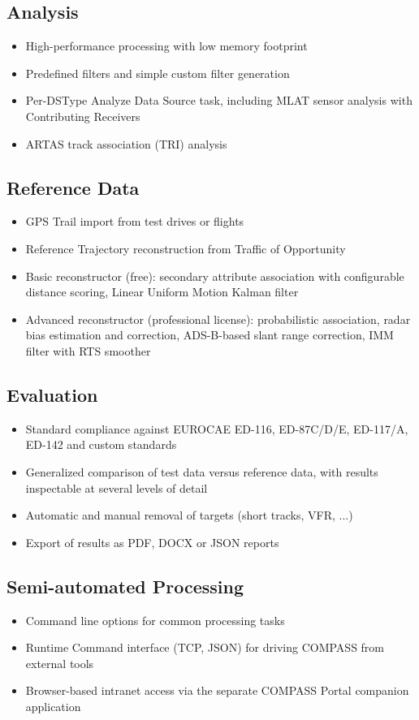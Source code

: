 \subsection{Analysis}
\begin{itemize}
    \item High-performance processing with low memory footprint
    \item Predefined filters and simple custom filter generation
    \item Per-DSType Analyze Data Source task, including MLAT sensor analysis with Contributing Receivers
    \item ARTAS track association (TRI) analysis
\end{itemize}

\subsection{Reference Data}
\begin{itemize}
    \item GPS Trail import from test drives or flights
    \item Reference Trajectory reconstruction from Traffic of Opportunity
    \item Basic reconstructor (free): secondary attribute association with configurable distance scoring, Linear Uniform Motion Kalman filter
    \item Advanced reconstructor (professional license): probabilistic association, radar bias estimation and correction, ADS-B-based slant range correction, IMM filter with RTS smoother
\end{itemize}

\subsection{Evaluation}
\begin{itemize}
    \item Standard compliance against EUROCAE ED-116, ED-87C/D/E, ED-117/A, ED-142 and custom standards
    \item Generalized comparison of test data versus reference data, with results inspectable at several levels of detail
    \item Automatic and manual removal of targets (short tracks, VFR, ...)
    \item Export of results as PDF, DOCX or JSON reports
\end{itemize}

\subsection{Semi-automated Processing}
\begin{itemize}
    \item Command line options for common processing tasks
    \item Runtime Command interface (TCP, JSON) for driving COMPASS from external tools
    \item Browser-based intranet access via the separate COMPASS Portal companion application
\end{itemize}
